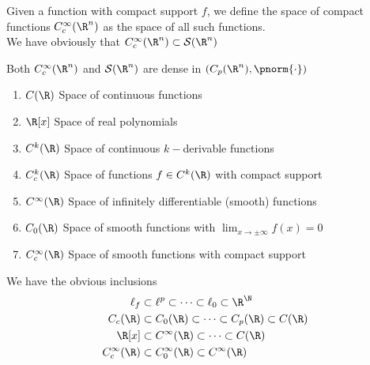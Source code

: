 \documentclass[../mmf.tex]{subfiles}
\begin{document}
\begin{dfn}
	Given a function with compact support $f$, we define the space of compact functions $C_c^{\infty}(\R^n)$ as the space of all such functions.\\
	We have obviously that $C_c^\infty(\R^n)\subset\mathcal{S}(\R^n)$
\end{dfn}
\begin{thm}
	Both $C_c^\infty(\R^n)$ and $\mathcal{S}(\R^n)$ are dense in $(C_p(\R^n),\pnorm{\cdot})$
\end{thm}
\begin{thm}
	\begin{enumerate}
	\item $C(\R)$ Space of continuous functions
	\item $\R[x]$ Space of real polynomials
	\item $C^k(\R)$ Space of continuous $k-$derivable functions
	\item $C^k_c(\R)$ Space of functions $f\in C^k(\R)$ with compact support
	\item $C^\infty(\R)$ Space of infinitely differentiable (smooth) functions
	\item $C_0(\R)$ Space of smooth functions with $\lim_{x\to\pm\infty}f(x)=0$
	\item $C_c^\infty(\R)$ Space of smooth functions with compact support
	\end{enumerate}
	We have the obvious inclusions
	\begin{equation*}
		\begin{aligned}
			\ell_f&\subset\ell^p\subset\cdots\subset\ell_0\subset\R^\N\\
			C_c(\R)&\subset C_0(\R)\subset\cdots\subset C_p(\R)\subset C(\R)\\
			\R[x]&\subset C^\infty(\R)\subset\cdots\subset C(\R)\\
			C_c^\infty(\R)&\subset C_0^\infty(\R)\subset C^\infty(\R)
		\end{aligned}
	\end{equation*}
\end{thm}
\end{document}
